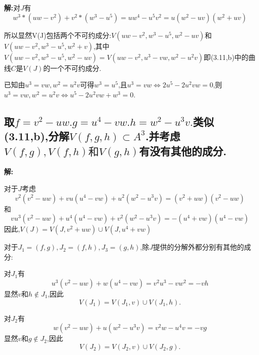 \documentclass[UTF8]{book}
\begin{document}
	
	\textbf{解:}对$ J $有
	\begin{equation*}
	w^{3}*(uw-v^{2}) + v^{2}*(w^{3}-u^{5}) = uw^{4} - u^{5}v^{2} = u(w^{2}-uv)(w^{2}+uv)
	\end{equation*}
	
	
	所以显然V(J)包括两个不可约成分:$ V( uw - v ^{2}, w ^{3}- u ^{5},w^{2}-uv) $和$ V( uw - v ^{2}, w ^{3}- u ^{5},w^{2}+v) $,其中$ V( uw - v ^{2}, w ^{3}- u ^{5},w^{2}-uv)  = V( uw - v ^{2},u^{3}-vw,w^{2} - u^{2}v)$即(3.11,b)中的曲线$ C $是$ V(J) $的一个不可约成分.
	
	
	已知由$ u^{3}=vw,w^{2} =u^{2}v $可得$w ^{3}= u ^{5} $,且$ u^{3}=vw \Leftrightarrow 2u^{5}-2u^{2}vw = 0$,则$ u^{3}=vw,w^{2} =u^{2}v \Leftrightarrow u^{5}- 2 u^{2} v w+w^{3}=0$.
	
	\subsection{取$f=v^{2}-u w . g=u^{4}-v w . h=w^{2}-u^{3} v .$类似(3.11,b),分解$V(f, g, h) \subset A^{3}$.并考虑$V(f, g), V(f, h) \text {和} V(g, h)$有没有其他的成分.}
	
	
	\textbf{解:}
	
	对于$ J $考虑
	\begin{equation*}
	v^{2}(v^{2}-uw)+vu(u^{4}-vw)+u^{2}(w^{2}-u^{3} v) = (v^{2}+u w)(v^{2}-u w)
	\end{equation*}
	和
	\begin{equation*}
	vu^{3}(v^{2}-uw)+u^{4}(u^{4}-vw)+v^{2}(w^{2}-u^{3} v) = -(u^{4}+v w)(u^{4}-v w)
	\end{equation*}
	因此,$ V(J) = V(J,v^{2}+u w) \cup V(J,u^{4}+v w) $
	
	对于$ J_{1} =  (f,g),J_{2} =  (f,h),J_{3} =  (g,h)$,除$ J $提供的分解外都分别有其他的成分:
	
	对$ J_{1} $有
	\begin{equation*}
	u^{3}(v^{2}-u w) + w(u^{4}-v w) = v^{2}u^{3}-vw^{2} = -vh
	\end{equation*}
	显然$ v $和$ h \notin J_{1}$,因此
	\begin{equation*}
	V(J_{1}) = V(J_{1},v) \cup V(J_{1},h).
	\end{equation*}
	
	对$ J_{2} $有
	\begin{equation*}
	w(v^{2}-u w) + u(w^{2}-u^{3} v) = v^{2}w-u^{4}v = -vg
	\end{equation*}
	显然$ v $和$ g \notin J_{2}$,因此
	\begin{equation*}
	V(J_{2}) = V(J_{2},v) \cup V(J_{2},g).
	\end{equation*}
	
\end{document}
